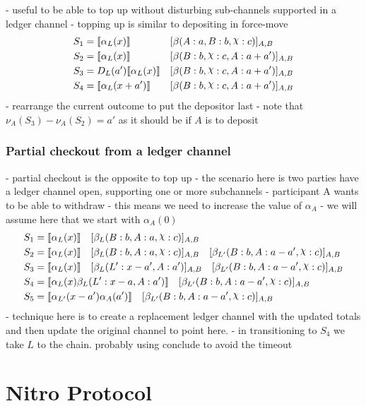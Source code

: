\documentclass{article}
\DeclareRobustCommand{\rchi}{{\mathpalette\irchi\relax}}
\newcommand{\irchi}[2]{\raisebox{\depth}{$#1\chi$}} %
\theoremstyle{definition}
\newcommand{\adj}[1]{\llbracket #1 \rrbracket}
\newcommand{\enf}[1]{[#1]}
\begin{document}
- useful to be able to top up without disturbing sub-channels supported in a ledger channel
- topping up is similar to depositing in force-move
\begin{align*}
S_1 &= \adj{\alpha_L(x)} &&\enf{\beta(A: a, B: b, \rchi: c)}_{A, B} \\
S_2 &= \adj{\alpha_L(x)} &&\enf{\beta(B: b, \rchi: c, A: a + a')}_{A, B} \\
S_3 &= D_L(a')\adj{\alpha_L(x)} &&\enf{\beta(B: b, \rchi: c, A: a + a')}_{A, B} \\
S_4 &= \adj{\alpha_L(x + a')} &&\enf{\beta(B: b, \rchi: c, A: a + a')}_{A, B}
\end{align*}
- rearrange the current outcome to put the depositor last
- note that $\nu_A(S_3) - \nu_A(S_2) = a'$ as it should be if $A$ is to deposit

\subsubsection{Partial checkout from a ledger channel}

- partial checkout is the opposite to top up
- the scenario here is two parties have a ledger channel open, supporting one or more subchannels
- participant A wants to be able to withdraw 
- this means we need to increase the value of $\alpha_A$ 
- we will assume here that we start with $\alpha_A(0)$
\begin{align*}
S_1 &= \adj{\alpha_L(x)} \quad \enf{\beta_L(B: b, A: a, \rchi: c)}_{A, B}  \\
S_2 &= \adj{\alpha_L(x)} \quad \enf{\beta_L(B: b, A: a, \rchi: c)}_{A, B} \quad \enf{\beta_{L'}(B: b, A: a - a', \rchi: c)}_{A, B}\\
S_3 &= \adj{\alpha_L(x)} \quad \enf{\beta_L(L': x-a', A: a')}_{A, B} \quad \enf{\beta_{L'}(B: b, A: a - a', \rchi: c)}_{A, B}\\
S_4 &= \adj{\alpha_L(x)\beta_L(L': x-a, A: a')} \quad \enf{\beta_{L'}(B: b, A: a - a', \rchi: c)}_{A, B}\\
S_5 &= \adj{\alpha_{L'}(x-a')\alpha_A(a')} \quad \enf{\beta_{L'}(B: b, A: a - a', \rchi: c)}_{A, B}
\end{align*}
- technique here is to create a replacement ledger channel with the updated totals and then update the 
  original channel to point here.
- in transitioning to $S_4$ we take $L$ to the chain. probably using conclude to avoid the timeout

\section{Nitro Protocol}
\end{document}

